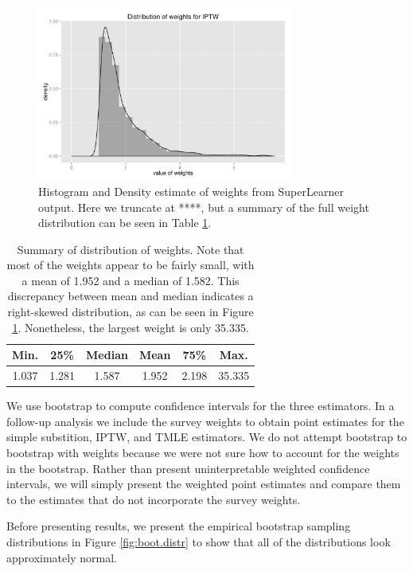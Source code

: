 \documentclass{article}
\begin{document}
\begin{figure}
\centering
\includegraphics[width=0.75\textwidth]{figures/density-plot_ghat.pdf}
\caption{Histogram and Density estimate of weights from SuperLearner output. Here we truncate at ****, but a summary of the full weight distribution can be seen in Table \ref{tab:weight.summary}.}
\label{fig:weight.dist}
\end{figure}

\begin{table}
\centering
\begin{tabular}{cccccc}
  \hline
 Min. & 25\% & Median & Mean & 75\% & Max. \\ 
  \hline
 1.037   & 1.281   & 1.587   & 1.952   &  2.198   &  35.335   \\ 
   \hline
\end{tabular}
\caption{Summary of distribution of weights. Note that most of the weights appear to be fairly small, with a mean of 1.952 and a median of 1.582. This discrepancy between mean and median indicates a right-skewed distribution, as can be seen in Figure \ref{fig:weight.dist}. Nonetheless, the largest weight is only 35.335.}
\label{tab:weight.summary}
\end{table}

We use bootstrap to compute confidence intervals for the three estimators. In a follow-up analysis we include the survey weights to obtain point estimates for the simple substition, IPTW, and TMLE estimators. We do not attempt bootstrap to bootstrap with weights because we were not sure how to account for the weights in the bootstrap. Rather than present uninterpretable weighted confidence intervals, we will simply present the weighted point estimates and compare them to the estimates that do not incorporate the survey weights.

Before presenting results, we present the empirical bootstrap sampling distributions in Figure \ref{fig:boot.distr} to show that all of the distributions look approximately normal.
\end{document}
